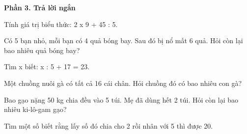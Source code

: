 \textbf{Phần 3. Trả lời ngắn}

\begin{ex} %
Tính giá trị biểu thức: 2 x 9 + 45 : 5.
\end{ex}

\begin{ex} %
Có 5 bạn nhỏ, mỗi bạn có 4 quả bóng bay. Sau đó bị nổ mất 6 quả. Hỏi còn lại bao nhiêu quả bóng bay?
\end{ex}

\begin{ex} %
Tìm x biết: x : 5 + 17 = 23.
\end{ex}

\begin{ex} %
Một chuồng nuôi gà có tất cả 16 cái chân. Hỏi chuồng đó có bao nhiêu con gà?
\end{ex}

\begin{ex} %
Bao gạo nặng 50 kg chia đều vào 5 túi. Mẹ đã dùng hết 2 túi. Hỏi còn lại bao nhiêu ki-lô-gam gạo?
\end{ex}

\begin{ex} %
Tìm một số biết rằng lấy số đó chia cho 2 rồi nhân với 5 thì được 20.
\end{ex}
